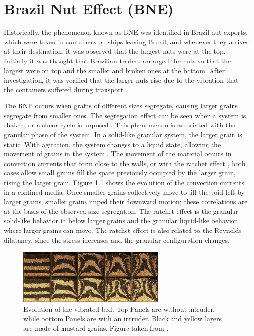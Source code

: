 \chapter{Brazil Nut Effect (BNE)}
\label{chap:BNE}
    Historically, the phenomenon known as BNE was identified in Brazil nut exports, which were taken in containers on ships leaving Brazil, and whenever they arrived at their destination, it was observed that the largest nuts were at the top. Initially it was thought that Brazilian traders arranged the nuts so that the largest were on top and the smaller and broken ones at the bottom. After investigation, it was verified that the larger nuts rise due to the vibration that the containers suffered during transport \cite{Caio-Tese}. 

    The BNE occurs when grains of different sizes segregate, causing larger grains segregate from smaller ones. The segregation effect can be seen when a system is shaken, or a shear cycle is imposed \cite{Granular_Physics}. This phenomenon is associated with the granular phase of the system. In a solid-like granular system, the larger grain is static. With agitation, the system changes to a liquid state, allowing the movement of grains in the system \cite{Why_the_Brazil_nuts_are_on_top}. The movement of the material occurs in convection currents that form close to the walls, or with the ratchet effect \cite{Effects_of_convection_and_friction_on_size_segregation_in_vibrated_granular_beds, Scaling_behavior_in_convection-driven_Brazil-nut_effect, Inertia_in_the_Brazil_nut_problem, The_water-enhance_Brazil_nut_effect}, both cases allow small grains fill the space previously occupied by the larger grain, rising the larger grain. Figure \ref{fig:BNE_hejmady_convection} shows the evolution of the convection currents in a confined media. Once smaller grains collectively move to fill the void left by larger grains, smaller grains imped their downward motion; these correlations are at the basis of the observed size segregation. The ratchet effect is the granular solid-like behavior in below larger grains and the granular liquid-like behavior, where larger grains can move. The ratchet effect is also related to the Reynolds dilatancy, since the stress increases and the granular configuration changes.

\begin{figure}
    \centering
    \includegraphics[width=0.65\textwidth]{04-figuras/BNE_Hejmady_Convection.png}
    \caption[Granular convection in vibrated bed.]{Evolution of the vibrated bed. Top Panels are without intruder, while bottom Panels are with an intruder. Black and yellow layers are made of mustard grains. Figure taken from \cite{Scaling_behavior_in_convection-driven_Brazil-nut_effect}.}
    \label{fig:BNE_hejmady_convection}
\end{figure}

